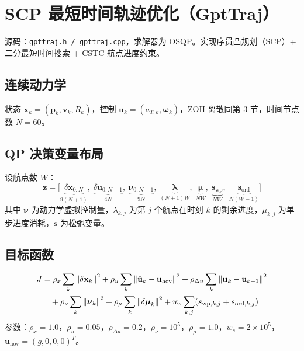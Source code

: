 \documentclass[UTF8, a4paper, 11pt]{ctexart}
\newcommand{\bx}{\mathbf{x}}
\newcommand{\bu}{\mathbf{u}}
\newcommand{\bp}{\mathbf{p}}
\newcommand{\bv}{\mathbf{v}}
\newcommand{\bw}{\boldsymbol{\omega}}
\newcommand{\norm}[1]{\left\|#1\right\|}
\begin{document}
\section{SCP 最短时间轨迹优化（GptTraj）}

源码：\texttt{gpttraj.h / gpttraj.cpp}，求解器为 OSQP。实现序贯凸规划（SCP）+ 二分最短时间搜索 + CSTC 航点进度约束。

\subsection{连续动力学}

状态 $\bx_k=(\bp_k,\bv_k,R_k)$，控制 $\bu_k=(a_{T,k},\bw_k)$，ZOH 离散同第 3 节，时间节点数 $N=60$。

\subsection{QP 决策变量布局}

设航点数 $W$：
\begin{equation}
  \mathbf{z} = \bigl[\underbrace{\delta\bx_{0:N}}_{9(N+1)},\;\underbrace{\delta\bu_{0:N-1}}_{4N},\;\underbrace{\boldsymbol{\nu}_{0:N-1}}_{9N},\;\underbrace{\boldsymbol{\lambda}}_{(N+1)W},\;\underbrace{\boldsymbol{\mu}}_{NW},\;\underbrace{\mathbf{s}_{\text{wp}}}_{NW},\;\underbrace{\mathbf{s}_{\text{ord}}}_{N(W-1)}\bigr]
\end{equation}
其中 $\boldsymbol{\nu}$ 为动力学虚拟控制量，$\lambda_{k,j}$ 为第 $j$ 个航点在时刻 $k$ 的剩余进度，$\mu_{k,j}$ 为单步进度消耗，$\mathbf{s}$ 为松弛变量。

\subsection{目标函数}

\begin{align}
  J &= \rho_x \sum_k\norm{\delta\bx_k}^2 + \rho_u \sum_k\norm{\bar{\bu}_k - \bu_{\text{hov}}}^2 + \rho_{\Delta u}\sum_k\norm{\bu_k - \bu_{k-1}}^2\notag\\
    &\quad + \rho_\nu\sum_k\norm{\boldsymbol{\nu}_k}^2 + \rho_\mu\sum_k\norm{\delta\boldsymbol{\mu}_k}^2 + w_s\sum_{k,j}(s_{\text{wp},k,j}+s_{\text{ord},k,j})
\end{align}
参数：$\rho_x=1.0$，$\rho_u=0.05$，$\rho_{\Delta u}=0.2$，$\rho_\nu=10^5$，$\rho_\mu=1.0$，$w_s=2\times10^5$，$\bu_{\text{hov}}=(g,0,0,0)^T$。
\end{document}
